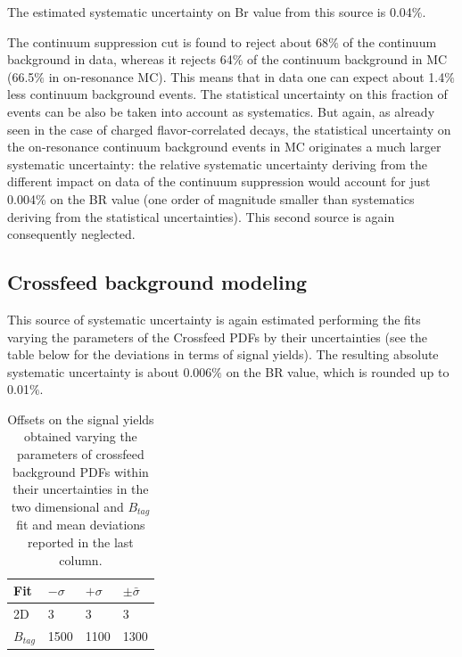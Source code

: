 \vspace{0.5 cm}
The estimated systematic uncertainty on Br value from this source is 0.04$\%$.

The continuum suppression cut is found to reject about 68$\%$ of the continuum background in data, whereas it rejects 64$\%$ of the continuum background in MC (66.5$\%$ in on-resonance MC). This means that in data one can expect about 1.4$\%$ less continuum background events. The statistical uncertainty on this fraction of events can be also be taken into account as systematics. But again, as already seen in the case of charged flavor-correlated decays, the statistical uncertainty on the on-resonance continuum background events in MC originates a much larger systematic uncertainty: the relative systematic uncertainty deriving from the different impact on data of the continuum suppression would account for just 0.004$\%$ on the BR value (one order of magnitude smaller than systematics deriving from the statistical uncertainties). This second source is again consequently neglected.

\subsection{Crossfeed background modeling}

This source of systematic uncertainty is again estimated performing the fits varying the parameters of the Crossfeed PDFs  by their uncertainties (see the table below for the deviations in terms of signal yields). 
The resulting absolute systematic uncertainty is about 0.006$\%$ on the BR value, which is rounded up to 0.01$\%$.

 \vspace{0.25 cm}
\begin{table}[H]
\begin{tabular}{ |p{2.5cm}||p{2cm}| p{2cm}|  p{2cm}|}
\hline
    Fit    &  $- \sigma$ &  $+ \sigma$ & $ \pm \bar{\sigma}$\\
 \hline
 2D        &     3  & 3  & 3 \\
 $B_{tag}$ &  1500 &  1100 & 1300 \\
 \hline
\end{tabular}
\caption{Offsets on the signal yields obtained varying the parameters of crossfeed background PDFs within their uncertainties in the two dimensional and $B_{tag}$ fit and mean deviations reported in the last column.}
\end{table}
 \vspace{0.25 cm}

